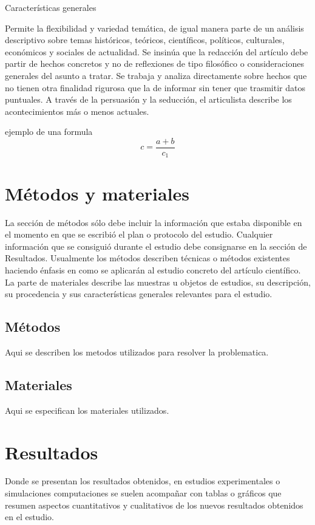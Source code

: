 \documentclass[10pt,letterpaper]{article}
\begin{document}
\begin{multicols}{2}
Características generales

    Permite la flexibilidad y variedad temática, de igual manera parte de un análisis descriptivo sobre temas históricos, teóricos, científicos, políticos, culturales, económicos y sociales de actualidad.
    Se insinúa que la redacción del artículo debe partir de hechos concretos y no de reflexiones de tipo filosófico o consideraciones generales del asunto a tratar.
    Se trabaja y analiza directamente sobre hechos que no tienen otra finalidad rigurosa que la de informar sin tener que trasmitir datos puntuales. A través de la persuasión y la seducción, el articulista describe los acontecimientos más o menos actuales.
    
    ejemplo de una formula
    \[c=\frac{a+b}{c_1}\]


\section{Métodos y materiales}
La sección de métodos sólo debe incluir la información que estaba disponible en el momento en que se escribió el plan o protocolo del estudio. Cualquier información que se consiguió durante el estudio debe consignarse en la sección de Resultados. Usualmente los métodos describen técnicas o métodos existentes haciendo énfasis en como se aplicarán al estudio concreto del artículo científico. La parte de materiales describe las muestras u objetos de estudios, su descripción, su procedencia y sus características generales relevantes para el estudio.
\subsection{Métodos}
Aqui se describen los metodos utilizados para resolver la problematica.

\subsection{Materiales}
Aqui se especifican los materiales utilizados.

\section{Resultados}
Donde se presentan los resultados obtenidos, en estudios experimentales o simulaciones computaciones se suelen acompañar con tablas o gráficos que resumen aspectos cuantitativos y cualitativos de los nuevos resultados obtenidos en el estudio.


\end{multicols}
\end{document}
